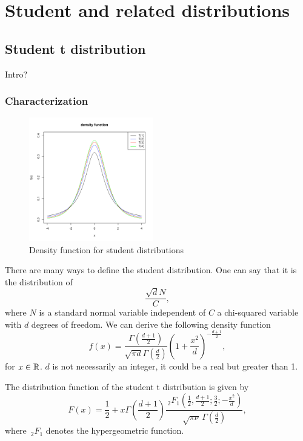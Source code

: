 \chapter{Student and related distributions}
\section{Student t distribution}
Intro?
\subsection{Characterization}
\begin{figure}
  \vspace{-20pt}
  \begin{center}
    \includegraphics[width=0.48\textwidth]{img/studentzoom}
  \end{center}
  \vspace{-20pt}  
  \caption{Density function for student distributions}
\end{figure}

There are many ways to define the student distribution. One can say that it is the distribution of
$$
\frac{\sqrt{d}N}{C},
$$
where $N$ is a standard normal variable independent of $C$ a chi-squared variable with $d$ degrees of freedom. We can derive the following density function
$$
f(x) =  \frac{\Gamma(\frac{d+1}{2})}{\sqrt{\pi d} \Gamma(\frac{d}{2}) } \left(1+\frac{x^2}{d}\right)^{-\frac{d+1}{2}},
$$
for $x\in\mathbb R$. $d$ is not necessarily an integer, it could be a real but greater than 1.

The distribution function of the student t distribution is given by
$$
F(x) = \frac{1}{2} + x \Gamma \left( \frac{d+1}{2} \right) \frac{ \,_2F_1 \left ( \frac{1}{2},\frac{d+1}{2};\frac{3}{2}; -\frac{x^2}{d} \right)}   {\sqrt{\pi\nu}\,\Gamma (\frac{d}{2})},
$$
where $\,_2F_1$ denotes the hypergeometric function.

